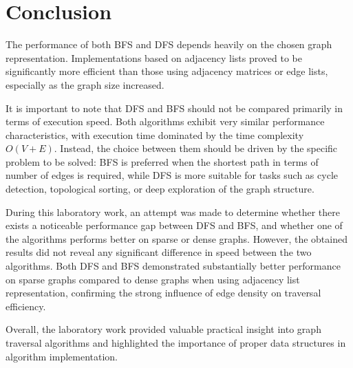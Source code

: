 \documentclass[12pt, a4paper]{report}
\begin{document}

\chapter{Conclusion}

The performance of both BFS and DFS depends heavily on the chosen graph representation. 
Implementations based on adjacency lists proved to be significantly more efficient than those using adjacency matrices or edge lists, especially as the graph size increased. 

It is important to note that DFS and BFS should not be compared primarily in terms of execution speed. Both algorithms exhibit very similar performance characteristics, with execution time dominated by the time complexity $O(V + E)$. 
Instead, the choice between them should be driven by the specific problem to be solved: BFS is preferred when the shortest path in terms of number of edges is required, while DFS is more suitable for tasks such as cycle detection, topological sorting, or deep exploration of the graph structure.

During this laboratory work, an attempt was made to determine whether there exists a noticeable performance gap between DFS and BFS, and whether one of the algorithms performs better on sparse or dense graphs. 
However, the obtained results did not reveal any significant difference in speed between the two algorithms. 
Both DFS and BFS demonstrated substantially better performance on sparse graphs compared to dense graphs when using adjacency list representation, confirming the strong influence of edge density on traversal efficiency.

Overall, the laboratory work provided valuable practical insight into graph traversal algorithms and highlighted the importance of proper data structures in algorithm implementation.
\end{document}
